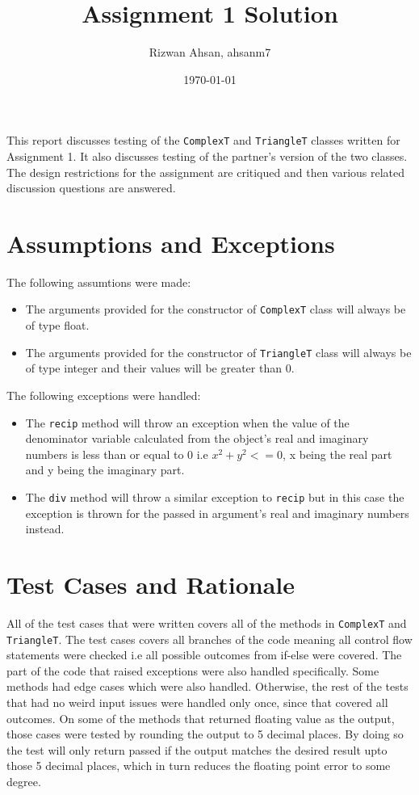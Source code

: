 \documentclass[12pt]{article}
\title{Assignment 1 Solution}
\author{Rizwan Ahsan, ahsanm7}
\date{\today}
\begin{document}
\maketitle

This report discusses testing of the \verb|ComplexT| and \verb|TriangleT|
classes written for Assignment 1. It also discusses testing of the partner's
version of the two classes. The design restrictions for the assignment
are critiqued and then various related discussion questions are answered.

\section{Assumptions and Exceptions} \label{AssumptAndExcept}
The following assumtions were made:
\begin{itemize}
	\item The arguments provided for the constructor of \verb|ComplexT| class will always be of 
	type float.
	\item The arguments provided for the constructor of \verb|TriangleT| class will always be of type integer and their values will be greater than 0.
\end{itemize}
The following exceptions were handled:
\begin{itemize}
	\item The \verb|recip| method will throw an exception when the value of the denominator variable calculated from the object's real and imaginary numbers is less than or equal 
	to 0 i.e \(x^2 + y^2 <= 0\), x being the real part and y being the imaginary part.
	\item The \verb|div| method will throw a similar exception to \verb|recip| but in this case
	the exception is thrown for the passed in argument's real and imaginary numbers instead.
\end{itemize}


\section{Test Cases and Rationale} \label{Testing}
All of the test cases that were written covers all of the methods in \verb|ComplexT| and 
\verb|TriangleT|. The test cases covers all branches of the code meaning all control flow statements were checked i.e all possible outcomes from if-else were covered. The part of
the code that raised exceptions were also handled specifically. Some methods had edge cases which 
were also handled. Otherwise, the rest of the tests that had no weird input issues were 
handled only once, since that covered all outcomes. On some of the methods that returned
floating value as the output, those cases were tested by rounding the output to 5 decimal places.
By doing so the test will only return passed if the output matches the desired result upto those 5 decimal places, which in turn reduces the floating point error to some degree.
\end{document}
